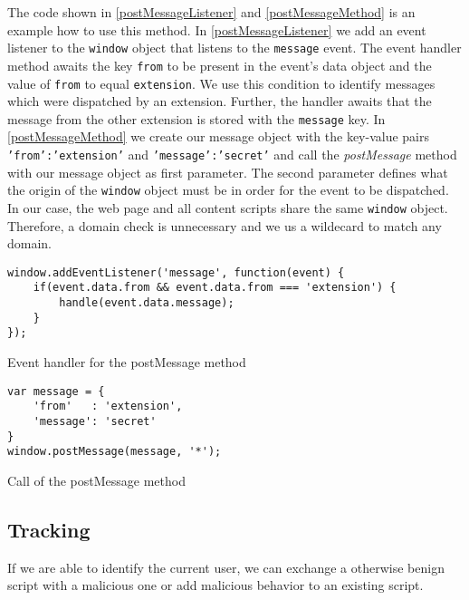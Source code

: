 	The code shown in \autoref{postMessageListener} and \autoref{postMessageMethod} is an example how to use this method. In \autoref{postMessageListener} we add an event listener to the \texttt{window} object that listens to the \texttt{message} event. The event handler method awaits the key \texttt{from} to be present in the event's data object and the value of \texttt{from} to equal \texttt{extension}. We use this condition to identify messages which were dispatched by an extension. Further, the handler awaits that the message from the other extension is stored with the \texttt{message} key. In \autoref{postMessageMethod} we create our message object with the key-value pairs \texttt{'from':'extension'} and \texttt{'message':'secret'} and call the \textit{postMessage} method with our message object as first parameter. The second parameter defines what the origin of the \texttt{window} object must be in order for the event to be dispatched. In our case, the web page and all content scripts share the same \texttt{window} object. Therefore, a domain check is unnecessary and we us a wildecard to match any domain.
	
	\begin{code}
		\begin{lstlisting}
window.addEventListener('message', function(event) {
	if(event.data.from && event.data.from === 'extension') {
		handle(event.data.message);
	}
});
\end{lstlisting}
		\caption{Event handler for the postMessage method}
		\label{postMessageListener}
	\end{code}
	
	\begin{code}
		\begin{lstlisting}
var message = {
	'from'   : 'extension',
	'message': 'secret'
}
window.postMessage(message, '*');
\end{lstlisting}
		\caption{Call of the postMessage method}
		\label{postMessageMethod}
	\end{code}

\subsection{Tracking}

	If we are able to identify the current user, we can exchange a otherwise benign script with a malicious one or add malicious behavior to an existing script. 
	
